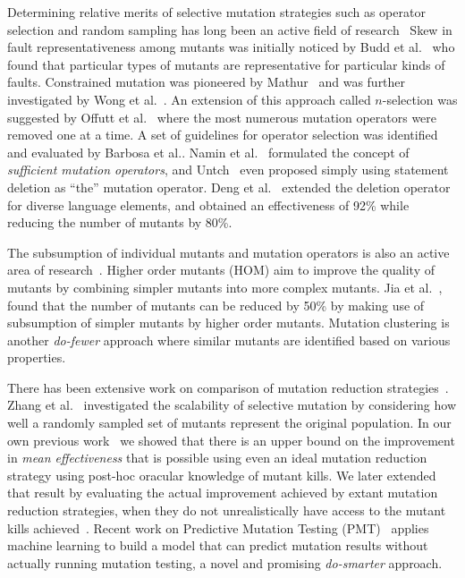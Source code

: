 Determining relative merits of selective mutation strategies such as operator
selection and random sampling has long been an active field of research~\cite{wong1995reducing,mresa1999efficiency,zhang2010isoperator} 
Skew in fault representativeness among mutants was initially noticed by Budd et
al.~\cite{budd1980mutation} who found that particular types of mutants are
representative for particular kinds of faults. Constrained mutation was
pioneered by Mathur~\cite{mathur1991performance,mathur1993evaluation}
and was further investigated by Wong et al.~\cite{wong1994constrained}.
An extension of this approach called $n$-selection was suggested by
Offutt et al.~\cite{offutt1993experimental} where the most numerous
mutation operators were removed one at a time. A set of guidelines for operator selection
was identified and evaluated by Barbosa et al.\cite{barbosa2001toward}.
Namin et al.~\cite{namin2006finding,namin2008sufficient} formulated the
concept of \emph{sufficient mutation operators}, and
Untch~\cite{untch2009onreduced} even proposed simply using statement
deletion as ``the'' mutation operator.  Deng et al.~\cite{deng2013empirical} extended the deletion operator for diverse
language elements, and obtained an effectiveness of 92\% while reducing the
number of mutants by 80\%.

The subsumption of individual mutants and mutation operators is also an active
area of research~\cite{gopinath2016measuring,shin2016theoretical,lindstrom2015redundant}.
Higher order mutants (HOM) aim to improve the quality of
mutants by combining simpler mutants into more complex mutants. Jia et
al.~\cite{jia2009higher,jia2008constructing}, found that the number of mutants
can be reduced by 50\% by making use of subsumption of simpler mutants
by higher order mutants.
Mutation clustering\cite{derezinska2015toward,strug2012machine,hussain2008mutation} is another \emph{do-fewer}
approach where similar mutants are identified based on various
properties.

There has been extensive work on comparison of mutation
reduction strategies~\cite{zhang2010isoperator,zhang2013operator}.
Zhang et al.~\cite{zhang2014an} investigated the scalability of
selective mutation by considering how well a randomly sampled set of mutants
represent the original population. 
In our own previous work~\cite{gopinath2016on} we showed that there is
an upper bound on the improvement
in \emph{mean effectiveness} that is possible using even
an ideal mutation reduction strategy using post-hoc oracular knowledge of mutant
kills. We later extended that result by evaluating the actual improvement
achieved by extant mutation reduction strategies, when they do not
unrealistically have access to the
mutant kills achieved~\cite{gopinath2017mutation}.  Recent work on Predictive 
Mutation Testing (PMT)~\cite{zhang2016predictive} applies machine 
learning to build a model that can predict mutation results without 
actually running mutation testing, a novel and promising
\emph{do-smarter} approach.



